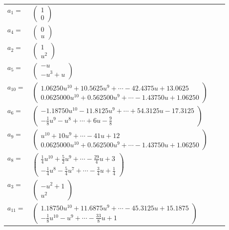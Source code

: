 \documentclass[1p]{elsarticle_modified}
\theoremstyle{definition}
\begin{document}
\begin{tabular}{m{7pt} m{180pt} m{7pt} m{180pt} }
\flushright $a_{1}=$&$\begin{pmatrix}1\\0\end{pmatrix}$ \\
\flushright $a_{4}=$&$\begin{pmatrix}0\\u\end{pmatrix}$ \\
\flushright $a_{2}=$&$\begin{pmatrix}1\\u^2\end{pmatrix}$ \\
\flushright $a_{5}=$&$\begin{pmatrix}- u\\- u^3+u\end{pmatrix}$ \\
\flushright $a_{10}=$&$\begin{pmatrix}1.06250 u^{10}+10.5625 u^{9}+\cdots-42.4375 u+13.0625\\0.0625000 u^{10}+0.562500 u^{9}+\cdots-1.43750 u+1.06250\end{pmatrix}$ \\
\flushright $a_{6}=$&$\begin{pmatrix}-1.18750 u^{10}-11.8125 u^{9}+\cdots+54.3125 u-17.3125\\-\frac{1}{8} u^9- u^8+\cdots+6 u-\frac{9}{8}\end{pmatrix}$ \\
\flushright $a_{9}=$&$\begin{pmatrix}u^{10}+10 u^9+\cdots-41 u+12\\0.0625000 u^{10}+0.562500 u^{9}+\cdots-1.43750 u+1.06250\end{pmatrix}$ \\
\flushright $a_{8}=$&$\begin{pmatrix}\frac{1}{4} u^{10}+\frac{5}{2} u^9+\cdots-\frac{29}{4} u+3\\-\frac{1}{4} u^8-\frac{5}{4} u^7+\cdots-\frac{3}{4} u+\frac{1}{4}\end{pmatrix}$ \\
\flushright $a_{3}=$&$\begin{pmatrix}- u^2+1\\u^2\end{pmatrix}$ \\
\flushright $a_{11}=$&$\begin{pmatrix}1.18750 u^{10}+11.6875 u^{9}+\cdots-45.3125 u+15.1875\\-\frac{1}{8} u^{10}- u^9+\cdots-\frac{33}{8} u+1\end{pmatrix}$ \\

\end{tabular}
\end{document}
